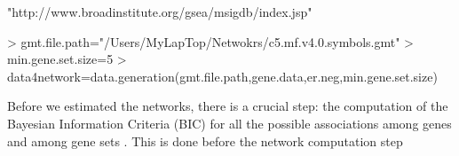 \documentclass[12pt]{article}
\begin{document}
"http://www.broadinstitute.org/gsea/msigdb/index.jsp" 
\footnotesize
\begin{Schunk}
\begin{Sinput}
> gmt.file.path="/Users/MyLapTop/Netwokrs/c5.mf.v4.0.symbols.gmt"
> min.gene.set.size=5
> data4network=data.generation(gmt.file.path,gene.data,er.neg,min.gene.set.size)
\end{Sinput}
\end{Schunk}
\normalsize
Before we estimated the networks, there is a crucial step: the computation of the Bayesian Information Criteria (BIC) for all the possible associations among genes and among gene sets \cite{Quiroz2013}. This is done before the network computation step
\footnotesize
\begin{Schunk}
\end{Schunk}
\normalsize
\end{document}
